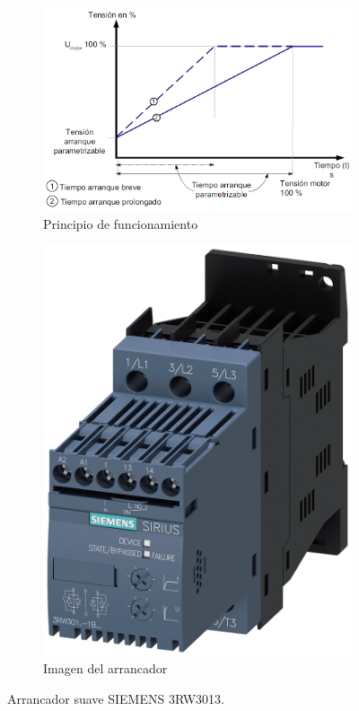 \begin{figure}
	\centering
	\begin{subfigure}[b]{0.69\textwidth}
		\centering
		\includegraphics[width=\textwidth]{Imagenes/RampasArrancador}
		\caption{Principio de funcionamiento}
		\label{fig:rampasarrancador}
	\end{subfigure}
	\hfill
	\begin{subfigure}[b]{0.3\textwidth}
		\centering
		\includegraphics[width=\textwidth]{Imagenes/3RW3013-1BB14_G_IC03_XX_31074P}
		\caption{Imagen del arrancador}
		\label{fig:3rw3013-1bb14gic03xx31074p}
		
	\end{subfigure}
	\caption{Arrancador suave SIEMENS 3RW3013.\cite{SIEMENS}}
\end{figure}



